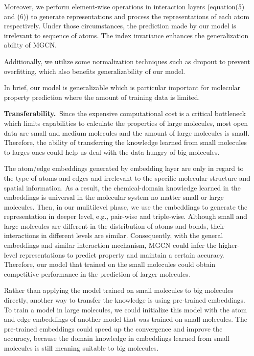 \documentclass[letterpaper]{article} \usepackage{bm}
\begin{document}
Moreover, we perform element-wise operations in interaction layers (equation(5) and (6)) to generate representations and process the representations of each atom  respectively. Under those circumstances, the prediction made by our model is irrelevant to sequence of atoms. The index invariance enhances the generalization ability of MGCN.

Additionally, we utilize some normalization techniques such as dropout to prevent overfitting, which also benefits generalizability of our model.

In brief, our model is generalizable which is particular important for molecular property prediction where the amount of training data is limited.

\textbf{Transferability.}\ Since the expensive computational cost is a critical bottleneck which limits capabilities to calculate the properties of large molecules, most open data are small and medium molecules and the amount of large molecules is small. Therefore, the ability of transferring the knowledge learned from small molecules to larges ones could help us deal with the data-hungry of big molecules.  

The atom/edge embeddings generated by embedding layer are only in regard to the type of atoms and edges and irrelevant to the specific molecular structure and 
spatial information. As a result, the chemical-domain knowledge learned in the embeddings is universal in the molecular system no matter small or large molecules. Then, in our mulitilevel phase, we use the embeddings to generate the representation in deeper level, e.g., pair-wise and triple-wise. Although small and large molecules are different in the distribution of atoms and bonds, their interactions in different levels are similar. Consequently, with the general embeddings and similar interaction mechanism, MGCN could infer the higher-level representations to predict property and maintain a certain accuracy. Therefore, our model that trained on the small molecules could obtain competitive performance in the prediction of larger molecules.

Rather than applying the model trained on small molecules to big molecules directly, another way to transfer the knowledge is using pre-trained embeddings. To train a model in large molecules, we could initialize this model with the atom and edge embeddings of another model that was trained on small molecules. The pre-trained embeddings could speed up the convergence and improve the accuracy, because the domain knowledge in embeddings learned from small molecules is still meaning suitable to big molecules.
\end{document}
